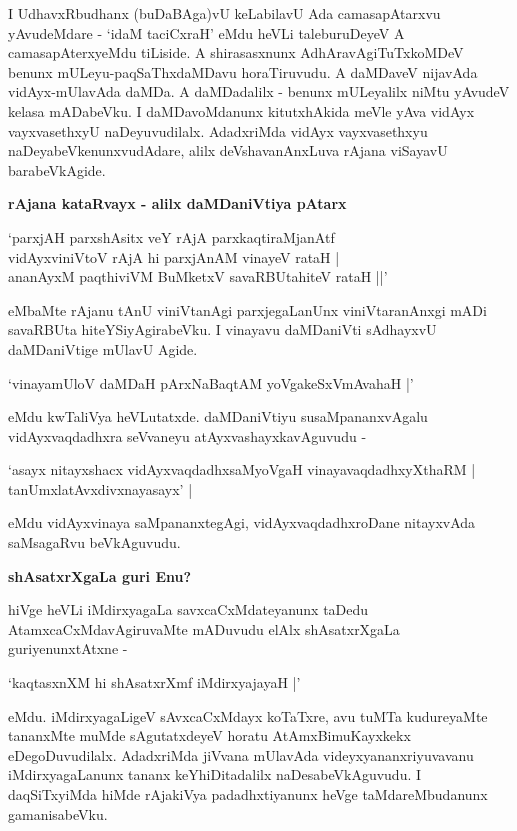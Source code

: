 I UdhavxRbudhanx (buDaBAga)vU keLabilavU Ada camasapAtarxvu yAvudeMdare - `idaM taciCxraH' eMdu heVLi taleburuDeyeV A camasapAterxyeMdu tiLiside. A shirasasxnunx AdhAravAgiTuTxkoMDeV benunx mULeyu-paqSaThxdaMDavu horaTiruvudu. A daMDaveV nijavAda vidAyx-mUlavAda daMDa. A daMDadalilx - benunx mULeyalilx niMtu yAvudeV kelasa mADabeVku. I daMDavoMdanunx kitutxhAkida meVle yAva vidAyx vayxvasethxyU naDeyuvudilalx. AdadxriMda vidAyx vayxvasethxyu naDeyabeVkenunxvudAdare, alilx deVshavanAnxLuva rAjana viSayavU barabeVkAgide.

\noindent
\textbf{rAjana kataRvayx - alilx daMDaniVtiya pAtarx}\label{page92}

\begin{shloka}
`parxjAH parxshAsitx veY rAjA parxkaqtiraMjanAtf\\\label{92}
vidAyxviniVtoV rAjA hi parxjAnAM vinayeV rataH |\\

ananAyxM paqthiviVM BuMketxV savaRBUtahiteV rataH ||'
\end{shloka}

eMbaMte rAjanu tAnU viniVtanAgi parxjegaLanUnx viniVtaranAnxgi mADi savaRBUta hiteYSiyAgirabeVku. I vinayavu daMDaniVti sAdhayxvU daMDaniVtige mUlavU Agide.

\begin{shloka}
`vinayamUloV daMDaH pArxNaBaqtAM yoVgakeSxVmAvahaH |'\label{93}
\end{shloka}

eMdu kwTaliVya heVLutatxde. daMDaniVtiyu susaMpananxvAgalu vidAyxvaqdadhxra seVvaneyu atAyxvashayxkavAguvudu -

\begin{shloka}
`asayx nitayxshacx vidAyxvaqdadhxsaMyoVgaH vinayavaqdadhxyXthaRM |\\\label{93}
tanUmxlatAvxdivxnayasayx' |
\end{shloka}

eMdu vidAyxvinaya saMpananxtegAgi, vidAyxvaqdadhxroDane nitayxvAda saMsagaRvu beVkAguvudu.

\noindent
\textbf{shAsatxrXgaLa guri Enu?}\label{page93}

hiVge heVLi iMdirxyagaLa savxcaCxMdateyanunx taDedu AtamxcaCxMdavAgiruvaMte mADuvudu elAlx shAsatxrXgaLa guriyenunxtAtxne -

\begin{shloka}
`kaqtasxnXM hi shAsatxrXmf iMdirxyajayaH |'\label{96}
\end{shloka}

eMdu. iMdirxyagaLigeV sAvxcaCxMdayx koTaTxre, avu tuMTa kudureyaMte tananxMte muMde sAgutatxdeyeV horatu AtAmxBimuKayxkekx eDegoDuvudilalx. AdadxriMda jiVvana mUlavAda videyxyananxriyuvavanu iMdirxyagaLanunx tananx keYhiDitadalilx naDesabeVkAguvudu. I daqSiTxyiMda hiMde rAjakiVya padadhxtiyanunx heVge taMdareMbudanunx gamanisabeVku.

